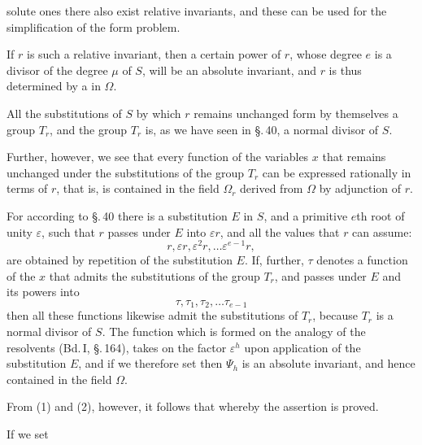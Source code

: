 solute ones there also exist relative invariants, and these can be
used for the simplification of the form problem.

If $r$ is such a relative invariant, then a certain power
of $r$, whose degree $e$ is a divisor of the degree $\mu$ of $S$,
will be an absolute invariant, and $r$ is thus determined by a  in $\Omega$.

All the substitutions of $S$ by which $r$ remains unchanged
form by themselves a group $T_r$, and the group $T_r$ is, as we
have seen in \S.\,40, a normal divisor of $S$.

Further, however, we see that every function of the variables $x$
that remains unchanged under the substitutions of the group $T_r$
can be expressed rationally in terms of $r$, that is, is contained in the
field $\Omega_r$ derived from $\Omega$ by adjunction of $r$.

For according to \S.\,40 there is a substitution $E$ in $S$, and
a primitive $e$th root of unity $\varepsilon$, such that $r$ passes under $E$ into $\varepsilon r$,
and all the values that $r$ can assume:
\[
r, \varepsilon r, \varepsilon^2 r, \ldots \varepsilon^{e-1} r,
\]
are obtained by repetition of the substitution $E$. If, further,
$\tau$ denotes a function of the $x$ that admits the substitutions of the group
$T_r$, and passes under $E$ and its powers into
\[
\tau, \tau_1, \tau_2, \ldots \tau_{e-1}
\]
then all these functions likewise admit the
substitutions of $T_r$, because $T_r$ is a normal divisor of $S$. The
function
which is formed on the analogy of the  resolvents (Bd.\,I,
\S.\,164), takes on the factor $\varepsilon^h$ upon application of the substitution $E$,
and if we therefore set
then $\Psi_h$ is an absolute invariant, and hence contained in the
field $\Omega$.

From (1) and (2), however, it follows that
whereby the assertion is proved.

If we set
